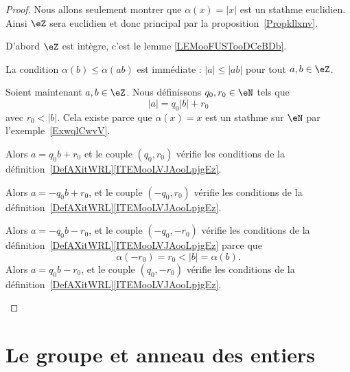 \begin{proof}
	Nous allons seulement montrer que \( \alpha(x)=| x |\) est un stathme euclidien. Ainsi \( \eZ\) sera euclidien et donc principal par la proposition~\ref{Propkllxnv}.

	D'abord \( \eZ\) est intègre, c'est le lemme \ref{LEMooFUSTooDCcBDb}.

	La condition \( \alpha(b)\leq \alpha(ab)\) est immédiate : \( | a |\leq | ab |\) pour tout \( a,b\in \eZ\).

	Soient maintenant \( a,b\in \eZ\). Nous définissons \( q_0,r_0\in \eN\) tels que
	\begin{equation}
		| a |=q_0| b |+r_0
	\end{equation}
	avec \( r_0<| b |\). Cela existe parce que \( \alpha(x)=x\) est un stathme sur \( \eN\) par l'exemple~\ref{ExwqlCwvV}.

	\begin{subproof}
		\spitem[Si \( a>0\) et \( b>0\)]

		Alors \( a=q_0b+r_0\) et le couple \( (q_0,r_0)\) vérifie les conditions de la définition~\ref{DefAXitWRL}\ref{ITEMooLVJAooLpjgEz}.

		\spitem[Si \( a>0\) et \( b<0\)]

		Alors \( a=-q_0b+r_0\), et le couple \( (-q_0,r_0)\) vérifie les conditions de la définition~\ref{DefAXitWRL}\ref{ITEMooLVJAooLpjgEz}.


		\spitem[Si \( a<0\) et \( b>0\)]
		Alors \( a=-q_0b-r_0\), et le couple \( (-q_0,-r_0)\) vérifie les conditions de la définition~\ref{DefAXitWRL}\ref{ITEMooLVJAooLpjgEz} parce que
		\begin{equation}
			\alpha(-r_0)=r_0<| b |=\alpha(b).
		\end{equation}
		\spitem[Si \( a<0\) et \( b<0\)]
		Alors \( a=q_0b-r_0\), et le couple \( (q_0,-r_0)\) vérifie les conditions de la définition~\ref{DefAXitWRL}\ref{ITEMooLVJAooLpjgEz}.

	\end{subproof}
\end{proof}



\section{Le groupe et anneau des entiers}

